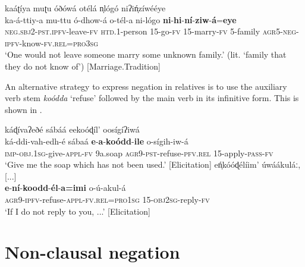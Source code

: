\documentclass[output=paper,colorlinks=true, citecolor=brown,draftmode]{langscibook}
\begin{document}
{
\ea\label{ex:cuw:50} kaáʈíya muʈu óðówá otélá n̩lógó niʔiń̩zíwééye \\ 
    \gll  ka-á-ttiy-a mu-ttu ó-dhow-á o-tél-a ni-lógo \textbf{ni}{}-\textbf{hi}{}-\textbf{ní}{}-\textbf{ziw}{}-\textbf{á}=\textbf{eye} \\
          \textsc{neg.sbj2-pst.ipfv-}leave-\textsc{fv} \textsc{htd.1}{}-person \textsc{15}{}-go-\textsc{fv} \textsc{15}{}-marry-\textsc{fv} \textsc{5}{}-family \textsc{agr}5-\textsc{neg-ipfv}{}-know-\textsc{fv}\textsc{.rel=pro3sg} \\
    \glt ‘One would not leave someone marry some unknown family.’ (lit. ‘family that they do not know of’) [Marriage.Tradition]
\z }


An alternative strategy to express negation in relatives is to use the auxiliary verb stem \textit{koódda} ‘refuse’ followed by the main verb in its infinitive form. This is shown in .


\ea\label{ex:cuw:51}
    \ea\label{ex:cuw:51a} káɖívaʔeðé sábáá eekoóɖíl’ oosígíʔiwá \\ 
        \gll  ká-ddi-vah-edh-é sábaá \textbf{e}{}-\textbf{a}{}-\textbf{koódd}{}-\textbf{ile} o-sígih-iw-á\\
              \textsc{imp-obj.1sg}{}-give-\textsc{appl-fv} 9a.soap \textsc{agr}9-\textsc{pst}{}-refuse-\textsc{pfv.rel} 15-apply-\textsc{pass-fv}\\
        \glt ‘Give me the soap which has not been used.’ [Elicitation]
    \ex\label{ex:cuw:51b} eń̩kóóɖélíim’ úwáákuláː, [...]  \\
        \gll \textbf{e}{}-\textbf{ní}{}-\textbf{koodd}{}-\textbf{él}{}-\textbf{a=imi} o-ú-akul-á \\
            \textsc{agr}9-\textsc{ipfv}{}-refuse-\textsc{appl}{}-\textsc{fv.rel=pro}1\textsc{sg} \textsc{15}{}-\textsc{obj}2\textsc{sg}{}-reply-\textsc{fv} \\
        \glt ‘If I do not reply to you, ...’ [Elicitation]
    \z
\z 

\section{Non-clausal negation}\label{sec:cuw:3}
\end{document}
